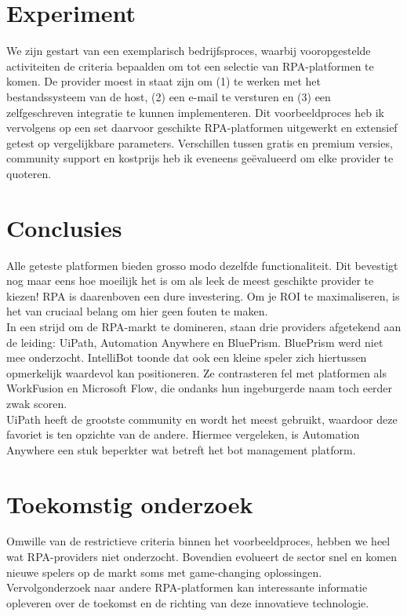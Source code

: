 \documentclass[a0,portrait]{a0poster}
\begin{document}
\begin{multicols}{2}
\section*{Experiment}
\color{black}
We zijn gestart van een exemplarisch bedrijfsproces, waarbij vooropgestelde activiteiten de criteria bepaalden om tot een selectie van RPA-platformen te komen. De provider moest in staat zijn om (1) te werken met het bestandssysteem van de host, (2) een e-mail te versturen en (3) een zelfgeschreven integratie te kunnen implementeren. Dit voorbeeldproces heb ik vervolgens op een set daarvoor geschikte RPA-platformen uitgewerkt en extensief getest op vergelijkbare parameters. Verschillen tussen gratis en premium versies, community support en kostprijs heb ik eveneens geëvalueerd om elke provider te quoteren.

\color{HoGentAccent1} 
\section*{Conclusies}
\color{black}
Alle geteste platformen bieden grosso modo dezelfde functionaliteit. Dit bevestigt nog maar eens hoe moeilijk het is om als leek de meest geschikte provider te kiezen! RPA is daarenboven een dure investering. Om je ROI te maximaliseren, is het van cruciaal belang om hier geen fouten te maken.\\
In een strijd om de RPA-markt te domineren, staan drie providers afgetekend aan de leiding: UiPath, Automation Anywhere en BluePrism. BluePrism werd niet mee onderzocht. IntelliBot toonde dat ook een kleine speler zich hiertussen opmerkelijk waardevol kan positioneren. Ze contrasteren fel met platformen als WorkFusion en Microsoft Flow, die ondanks hun ingeburgerde naam toch eerder zwak scoren.\\
UiPath heeft de grootste community en wordt het meest gebruikt, waardoor deze favoriet is ten opzichte van de andere. Hiermee vergeleken, is Automation Anywhere een stuk beperkter wat betreft het bot management platform.

\color{HoGentAccent1} 
\section*{Toekomstig onderzoek}
\color{black}
Omwille van de restrictieve criteria binnen het voorbeeldproces, hebben we heel wat RPA-providers niet onderzocht. Bovendien evolueert de sector snel en komen nieuwe spelers op de markt soms met game-changing oplossingen. Vervolgonderzoek naar andere RPA-platformen kan interessante informatie opleveren over de toekomst en de richting van deze innovatieve technologie.


\end{multicols}
\end{document}
